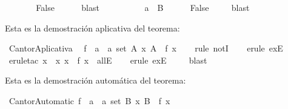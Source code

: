 \begin{isabellebody}
\ \ \ \ \isamarkupfalse%
\ \isamarkupfalse%
\ False\ \ \isamarkupfalse%
\ {}\ \isamarkupfalse%
\ blast\isanewline
\ \ \isamarkupfalse%
\ \isanewline
\ \ \ \ \isamarkupfalse%
\ {\isachardoublequoteopen}a\ {\isasymnotin}\ {\isacharquery}B{\isachardoublequoteclose}\isanewline
\ \ \ \ \isamarkupfalse%
\ False\ \isamarkupfalse%
\ {}\ \isamarkupfalse%
\ blast\isanewline
\ \ \isamarkupfalse%
\isanewline
{}\isamarkupfalse%
%
\endisatagproof
{\isafoldproof}%
%
\isadelimproof
%
\endisadelimproof
%
\begin{isamarkuptext}%
Esta es la demostración aplicativa del teorema:%
\end{isamarkuptext}\isamarkuptrue%
\isamarkupfalse%
\ CantorAplicativa\ {\isacharcolon}\isanewline
\ {\isachardoublequoteopen}{\isasymnexists}f\ {\isacharcolon}{\isacharcolon}\ {\isacharprime}a\ {\isasymRightarrow}\ {\isacharprime}a\ set{\isachardot}\ {\isasymforall}A{\isachardot}\ {\isasymexists}x{\isachardot}\ A\ {\isacharequal}\ f\ x{\isachardoublequoteclose}\isanewline
%
\isadelimproof
\ \ %
\endisadelimproof
%
\isatagproof
{}\isamarkupfalse%
\ {\isacharparenleft}rule\ notI{\isacharparenright}\isanewline
\ \ \isamarkupfalse%
\ {\isacharparenleft}erule\ exE{\isacharparenright}\isanewline
\ \ \isamarkupfalse%
\ {\isacharparenleft}erule{\isacharunderscore}tac\ x\ {\isacharequal}\ {\isachardoublequoteopen}{\isacharbraceleft}x{\isachardot}\ x\ {\isasymnotin}\ f\ x{\isacharbraceright}{\isachardoublequoteclose}\ \ allE{\isacharparenright}\isanewline
\ \ \isamarkupfalse%
\ {\isacharparenleft}erule\ exE{\isacharparenright}\isanewline
\ \ \isamarkupfalse%
\ \ blast\ \isanewline
\ \ \isamarkupfalse%
%
\endisatagproof
{\isafoldproof}%
%
\isadelimproof
%
\endisadelimproof
%
\begin{isamarkuptext}%
Esta es la demostración automática del teorema:%
\end{isamarkuptext}\isamarkuptrue%
\isamarkupfalse%
\ CantorAutomatic{\isacharcolon}\ {\isachardoublequoteopen}{\isasymnexists}f\ {\isacharcolon}{\isacharcolon}\ {\isacharprime}a\ {\isasymRightarrow}\ {\isacharprime}a\ set{\isachardot}\ {\isasymforall}B{\isachardot}\ {\isasymexists}x{\isachardot}\ B\ {\isacharequal}\ f\ x{\isachardoublequoteclose}\isanewline

\end{isabellebody}
